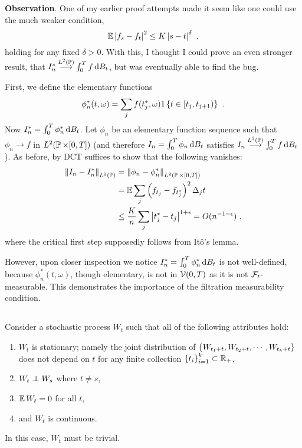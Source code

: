 \documentclass{article}
\begin{document}
  \textbf{Observation}. One of my earlier proof attempts made it seem like one could use the much weaker condition,
    \[
    \E\abs{f_s-f_t}^2\le K\abs{s-t}^{\delta}\,\,,
  \]
  holding for any fixed \(\delta>0\). With this, I thought I could prove an even stronger result, that \(I_n^*\convlp\int_0^Tf\d{B_t}\), but was eventually able to find the bug.

  First, we define the elementary functions
  \[
    \phi_n^*(t, \omega)=\sum_jf(t_j^*,\omega)1\ca{t\in[t_j,t_{j+1})}\,\,.
  \]
  Now \(I_n^*=\int_0^T\phi_n^*\d{B_t}\). Let \(\phi_n\) be an elementary function sequence such that \(\phi_n\rightarrow f\) in \(L^2(\P\times[0,T])\) (and therefore \(I_n=\int_0^T\phi_n\d{B_t}\) satisfies \(I_n\convlp \int_0^T f\d{B_t}\)). As before, by DCT suffices to show that the following vanishes:
  \begin{align*}
    \norm{I_n-I_n^*}_{L^2(\P)}
    &=\norm{\phi_n-\phi_n^*}_{L^2(\P\times[0,T])}\\
    &=\E\sum_j\pa{f_{t_j}-f_{t_j^*}}^2\Delta_jt\\
    &\le\frac{K}{n}\sum_j\abs{t_j^*-t_j}^{1+\epsilon}=O(n^{-1-\epsilon})\,\,,
  \end{align*}
  where the critical first step supposedly follows from It\^{o}'s lemma.

  However, upon closer inspection we notice \(I_n^*=\int_0^T\phi_n^*\d{B_t}\) is not well-defined, because \(\phi_n^*(t,\omega)\), though elementary, is not in \(\mcV(0, T)\) as it is not \(\mcF_t\)-measurable. This demonstrates the importance of the filtration measurability condition.

  \subsection{}

  Consider a stochastic process \(W_t\) such that all of the following attributes hold:
  \begin{enumerate}
  \item \(W_t\) is stationary; namely the joint distribution of \(\ca{W_{t_1+t},W_{t_2+t},\cdots,W_{t_k+t}}\) does not depend on \(t\) for any finite collection \(\ca{t_i}_{i=1}^k\subset \R_+\),
  \item \(W_t\independent W_s\) where \(t\neq s\),
  \item \(\E W_t=0\) for all \(t\),
  \item and \(W_t\) is continuous.
  \end{enumerate}
  In this case, \(W_t\) must be trivial.
\end{document}
